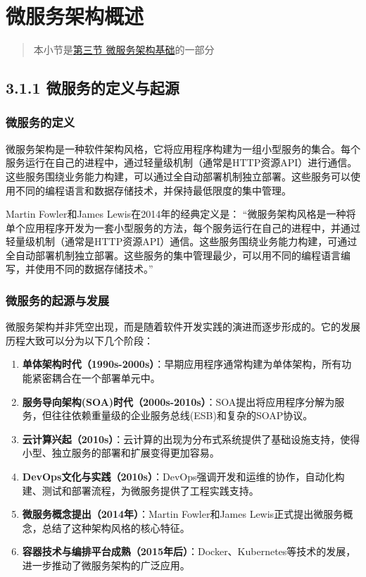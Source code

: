 \section{微服务架构概述}\label{ux5faeux670dux52a1ux67b6ux6784ux6982ux8ff0}

\begin{quote}
本小节是\href{section03-03.md}{第三节 微服务架构基础}的一部分
\end{quote}

\subsection{3.1.1
微服务的定义与起源}\label{ux5faeux670dux52a1ux7684ux5b9aux4e49ux4e0eux8d77ux6e90}

\subsubsection{微服务的定义}\label{ux5faeux670dux52a1ux7684ux5b9aux4e49}

微服务架构是一种软件架构风格，它将应用程序构建为一组小型服务的集合。每个服务运行在自己的进程中，通过轻量级机制（通常是HTTP资源API）进行通信。这些服务围绕业务能力构建，可以通过全自动部署机制独立部署。这些服务可以使用不同的编程语言和数据存储技术，并保持最低限度的集中管理。

Martin Fowler和James Lewis在2014年的经典定义是：
``微服务架构风格是一种将单个应用程序开发为一套小型服务的方法，每个服务运行在自己的进程中，并通过轻量级机制（通常是HTTP资源API）通信。这些服务围绕业务能力构建，可通过全自动部署机制独立部署。这些服务的集中管理最少，可以用不同的编程语言编写，并使用不同的数据存储技术。''

\subsubsection{微服务的起源与发展}\label{ux5faeux670dux52a1ux7684ux8d77ux6e90ux4e0eux53d1ux5c55}

微服务架构并非凭空出现，而是随着软件开发实践的演进而逐步形成的。它的发展历程大致可以分为以下几个阶段：

\begin{enumerate}
\def\labelenumi{\arabic{enumi}.}
\item
  \textbf{单体架构时代（1990s-2000s）}：早期应用程序通常构建为单体架构，所有功能紧密耦合在一个部署单元中。
\item
  \textbf{服务导向架构(SOA)时代（2000s-2010s）}：SOA提出将应用程序分解为服务，但往往依赖重量级的企业服务总线(ESB)和复杂的SOAP协议。
\item
  \textbf{云计算兴起（2010s）}：云计算的出现为分布式系统提供了基础设施支持，使得小型、独立服务的部署和扩展变得更加容易。
\item
  \textbf{DevOps文化与实践（2010s）}：DevOps强调开发和运维的协作，自动化构建、测试和部署流程，为微服务提供了工程实践支持。
\item
  \textbf{微服务概念提出（2014年）}：Martin Fowler和James
  Lewis正式提出微服务概念，总结了这种架构风格的核心特征。
\item
  \textbf{容器技术与编排平台成熟（2015年后）}：Docker、Kubernetes等技术的发展，进一步推动了微服务架构的广泛应用。
\end{enumerate}

